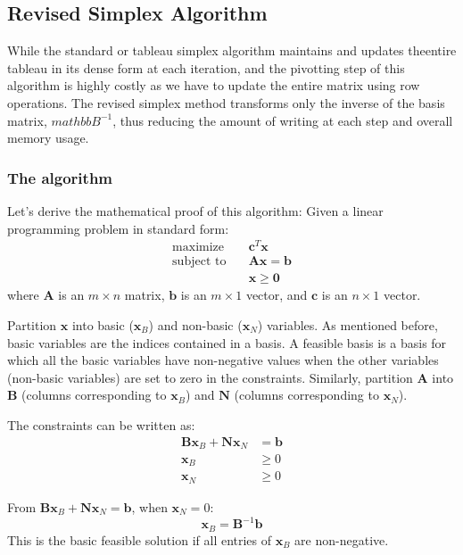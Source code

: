 \subsection{Revised Simplex Algorithm}
While the standard or tableau simplex algorithm maintains and updates theentire tableau in its
dense form at each iteration, and the pivotting step of this algorithm is highly costly as we have to update the entire matrix using row operations. The revised simplex method transforms only the inverse of the basis matrix, $mathbb{B}^{-1}$, thus reducing the amount of writing at each step and overall memory usage.

\subsubsection{The algorithm}
Let's derive the mathematical proof of this algorithm:
Given a linear programming problem in standard form:
\begin{align*}
    \text{maximize} \quad   & \mathbf{c}^T \mathbf{x}           \\
    \text{subject to} \quad & \mathbf{A}\mathbf{x} = \mathbf{b} \\
                            & \mathbf{x} \geq \mathbf{0}
\end{align*}
where \(\mathbf{A} \) is an \( m \times n \) matrix,
\( \mathbf{b} \) is an \( m \times 1 \) vector, and
\( \mathbf{c} \) is an \( n \times 1 \) vector.


Partition \( \mathbf{x} \) into basic (\(\mathbf{x}_B \)) and non-basic (\( \mathbf{x}_N \)) variables.
As mentioned before, basic variables are the indices contained in a basis. A feasible basis is a basis for which
all the basic variables have non-negative values when the other variables (non-basic
variables) are set to zero in the constraints.
Similarly, partition \( \mathbf{A} \) into \( \mathbf{B} \) (columns corresponding to \( \mathbf{x}_B \))
and \( \mathbf{N} \) (columns corresponding to \( \mathbf{x}_N \)).

The constraints can be written as:
\begin{align*}
    \mathbf{B}\mathbf{x}_B + \mathbf{N}\mathbf{x}_N & = \mathbf{b} \\
    \mathbf{x}_B                                    & \geq 0       \\
    \mathbf{x}_N                                    & \geq 0
\end{align*}

From \( \mathbf{B}\mathbf{x}_B + \mathbf{N}\mathbf{x}_N = \mathbf{b} \), when \( \mathbf{x}_N = 0 \):
\[ \mathbf{x}_B = \mathbf{B}^{-1}\mathbf{b} \]
This is the basic feasible solution if all entries of \( \mathbf{x}_B \) are non-negative.

